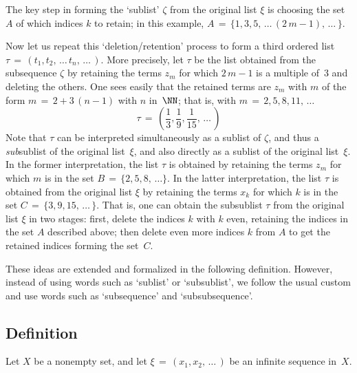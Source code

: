         The key step in forming the `sublist' ${\zeta}$ from the original list ${\xi}$ is choosing the set $A$ of which indices $k$ to retain;
    in this example, $A \,=\, \{1, 3, 5, \,{\ldots}\,(2\,m-1),\,{\ldots}\,\}$.

        Now let us repeat this `deletion/retention' process to form a third ordered list ${\tau} \,=\, (t_{1}, t_{2},\,{\ldots}\,t_{n},\,{\ldots}\,)$.
    More precisely, let ${\tau}$ be the list obtained from the subsequence ${\zeta}$ by retaining
    the terms $z_{m}$ for which $2\,m-1$ is a multiple of~$3$ and deleting the others.
    One sees easily that the retained terms are $z_{m}$ with $m$ of the form $m \,=\, 2 + 3\,(n-1)$ with $n$ in~${\NN}$;
    that is, with $m \,=\, 2, 5, 8, 11, \,{\ldots}\,$
        \begin{displaymath}
        {\tau} \,=\, \left(\frac{1}{3}, \frac{1}{9}, \frac{1}{15},\,{\ldots}\,\right)
        \end{displaymath}
    Note that ${\tau}$ can be interpreted simultaneously as a sublist of ${\zeta}$, and thus a {\em sub}sublist of the original list~${\xi}$,
    and also directly as a sublist of the original list~${\xi}$. In the former interpretation, the list ${\tau}$ is obtained
    by retaining the terms $z_{m}$ for which $m$ is in the set $B \,=\, \{2, 5, 8, \,{\ldots}\}$.
    In the latter interpretation, the list ${\tau}$ is obtained from the original list ${\xi}$ by retaining the terms $x_{k}$
    for which $k$ is in the set $C \,=\, \{3, 9, 15, \,{\ldots}\,\}$. That is, one can obtain the subsublist ${\tau}$ from the original list ${\xi}$
    in two stages: first, delete the indices $k$ with $k$ even, retaining the indices in the set $A$ described above;
    then delete even more indices $k$ from $A$ to get the retained indices forming the set~$C$.

        These ideas are extended and formalized in the following definition. However, instead of using words such as `sublist' or `subsublist',
    we follow the usual custom and use words such as `subsequence' and `subsubsequence'.

\VV


        \subsection{\small{{\bf Definition}}}
        \label{DefA40.40}

        Let $X$ be a nonempty set, and let ${\xi} \,=\, (x_{1}, x_{2},\,{\ldots}\,)$ be an infinite sequence in~$X$.

